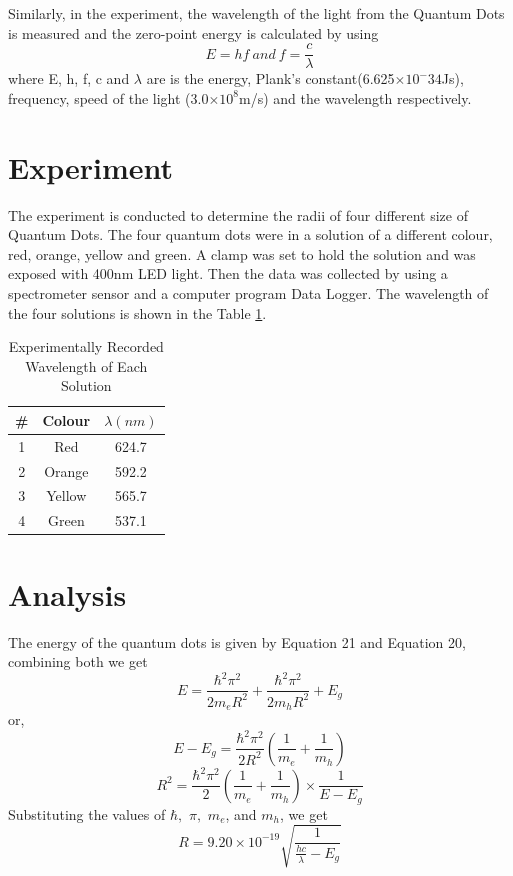 \documentclass[12pt]{report}
\begin{document}
Similarly, in the experiment, the wavelength of the light from the Quantum Dots is measured and the zero-point energy is calculated by using
\begin{equation}
    E = hf \: and \: f = \frac{c}{\lambda}
\end{equation}
where E, h, f, c and $\lambda$ are is the energy, Plank's constant(6.625$\times 10^-34$Js), frequency, speed of the light (3.0$\times 10^8$m/s) and the wavelength respectively.


\section{Experiment}

The experiment is conducted to determine the radii of four different size of Quantum Dots. The four quantum dots were in a  solution of a different colour, red, orange, yellow and green. A clamp was set to hold the solution and was exposed with 400nm LED light. Then the data was collected by using a spectrometer sensor and a computer program Data Logger. The wavelength of the four solutions is shown in the Table \ref{tbl:wl}.
\newline

\begin{table}[]
\centering
\begin{tabular}{|c|c|c|}
\hline
\textbf{\#} & \textbf{Colour} & \textbf{$\lambda(nm)$} \\ \hline
1          & Red             & 624.7                  \\ \hline
2          & Orange          & 592.2                  \\ \hline
3          & Yellow          & 565.7                  \\ \hline
4          & Green           & 537.1                  \\ \hline
\end{tabular}
\caption{Experimentally Recorded Wavelength of Each Solution }
\label{tbl:wl}
\end{table}


\section{Analysis}


The energy of the quantum dots is given by Equation 21 and Equation 20, combining both we get
\begin{equation}
    E = \frac{\hbar^2 \pi^2}{2m_eR^2} + \frac{\hbar^2 \pi^2}{2m_hR^2} + E_g 
\end{equation}
or,
\begin{equation*}
    E - E_g  = \frac{\hbar^2 \pi^2}{2R^2} (\frac{1}{m_e} + \frac{1}{m_h}) 
\end{equation*}
\begin{equation*}
    R^2 =   \frac{\hbar^2 \pi^2}{2} (\frac{1}{m_e} + \frac{1}{m_h}) \times \frac{1}{E - E_g}
\end{equation*}
Substituting the values of $\hbar,$ $\pi,$ $m_e$, and  $m_h$, we get
\begin{equation}
    R =   9.20\times  10^{-19} \sqrt{\frac{1}{\frac{hc}{\lambda} - E_g}}
\end{equation}
\end{document}
